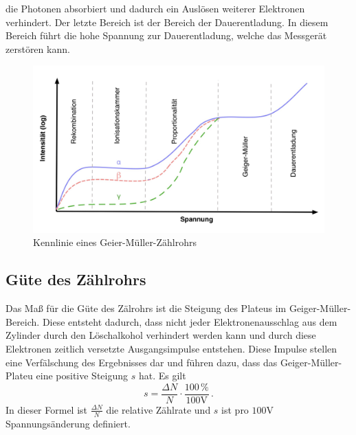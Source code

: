 die Photonen absorbiert und dadurch ein Auslösen weiterer Elektronen verhindert. Der 
letzte Bereich ist der Bereich der Dauerentladung. In diesem Bereich führt die hohe Spannung
zur Dauerentladung, welche das Messgerät zerstören kann.  
\begin{figure}[H]
    \centering
    \includegraphics[width=\textwidth]{content/Bilder/Kennlinie.jpeg}
    \caption{Kennlinie eines Geier-Müller-Zählrohrs}
    \label{fig:Aufbau}
\end{figure}
\subsection{Güte des Zählrohrs}
Das Maß für die Güte des Zälrohrs ist die Steigung des Plateus im Geiger-Müller-Bereich. 
Diese entsteht dadurch, dass nicht jeder Elektronenausschlag aus dem Zylinder durch den 
Löschalkohol verhindert werden kann und durch diese Elektronen zeitlich versetzte 
Ausgangsimpulse entstehen. Diese Impulse stellen eine Verfälschung des Ergebnisses dar und 
führen dazu, dass das Geiger-Müller-Plateu eine positive Steigung $s$ hat. Es gilt 
\begin{equation}
    s = \frac{\Delta N}{N} \cdot \frac{100 \,\%}{100 \unit{\volt}} \, .
\end{equation}
In dieser Formel ist $\frac{\Delta N}{N}$ die relative Zählrate und $s$ ist pro 
$100 \unit{\volt}$ Spannungsänderung definiert. 

